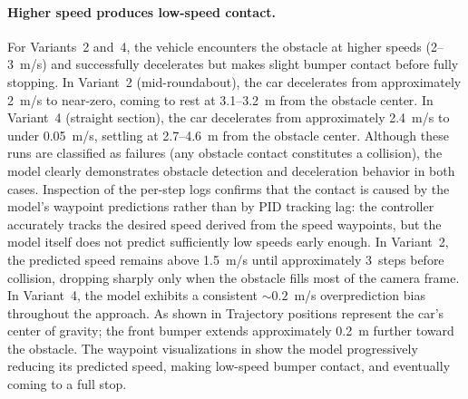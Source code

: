 \paragraph{Higher speed produces low-speed contact.}
For Variants~2 and~4, the vehicle encounters the obstacle at higher speeds (2--3~m/s) and successfully decelerates but makes slight bumper contact before fully stopping. In Variant~2 (mid-roundabout), the car decelerates from approximately 2~m/s to near-zero, coming to rest at 3.1--3.2~m from the obstacle center. In Variant~4 (straight section), the car decelerates from approximately 2.4~m/s to under 0.05~m/s, settling at 2.7--4.6~m from the obstacle center. Although these runs are classified as failures (any obstacle contact constitutes a collision), the model clearly demonstrates obstacle detection and deceleration behavior in both cases. Inspection of the per-step logs confirms that the contact is caused by the model's waypoint predictions rather than by PID tracking lag: the controller accurately tracks the desired speed derived from the speed waypoints, but the model itself does not predict sufficiently low speeds early enough. In Variant~2, the predicted speed remains above 1.5~m/s until approximately 3~steps before collision, dropping sharply only when the obstacle fills most of the camera frame. In Variant~4, the model exhibits a consistent ${\sim}0.2$~m/s overprediction bias throughout the approach. {As shown in}  Trajectory positions represent the car's center of gravity; the front bumper extends approximately 0.2~m further toward the obstacle. The waypoint visualizations in  show the model progressively reducing its predicted speed, making low-speed bumper contact, and eventually coming to a full stop.

